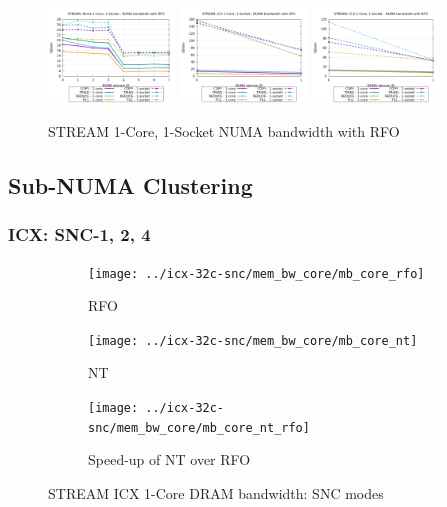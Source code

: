 \documentclass{article}
\begin{document}
 
\begin{figure}[!ht]
    \centering
    \includegraphics[width=0.3\textwidth]{../mem_bw_numa/Rome_numa_nps4_compact_rfo}
    \includegraphics[width=0.3\textwidth]{../mem_bw_numa/ICX_numa_nps1_compact_rfo}
    \includegraphics[width=0.3\textwidth]{../mem_bw_numa/CLX_numa_nps1_compact_rfo}
    \caption{STREAM 1-Core, 1-Socket NUMA bandwidth with RFO}
    \label{figure:mem_bw_numa_rfo}
\end{figure}


\clearpage
\subsection{Sub-NUMA Clustering}
\subsubsection{ICX: SNC-1, 2, 4}

\begin{figure}[!hb]
    \centering
    \begin{subfigure}[!hb]{0.3\textwidth}
         \centering
         \texttt{[image: ../icx-32c-snc/mem\_bw\_core/mb\_core\_rfo]}
         \caption{RFO}
         \label{figure:mem_bw_core_rfo_icx_snc}
    \end{subfigure}
    \begin{subfigure}[!hb]{0.3\textwidth}
         \centering
         \texttt{[image: ../icx-32c-snc/mem\_bw\_core/mb\_core\_nt]}
         \caption{NT}
         \label{figure:mem_bw_core_nt_icx_snc}
    \end{subfigure}
    \begin{subfigure}[!hb]{0.3\textwidth}
         \centering
         \texttt{[image: ../icx-32c-snc/mem\_bw\_core/mb\_core\_nt\_rfo]}
         \caption{Speed-up of NT over RFO}
         \label{figure:mem_bw_core_nt_rfo_icx_snc}
    \end{subfigure}

    \caption{STREAM ICX 1-Core DRAM bandwidth: SNC modes}
    \label{figure:mem_bw_core_icx_snc}
\end{figure}
\end{document}
